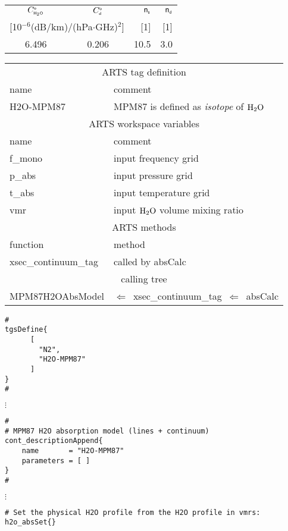 {\begin{center}
\begin{tabular}{ccrr}
\hline
\multicolumn{1}{c}{$C^{\mbox{\tiny \sf o}}_{\mbox{\tiny \sf H}_{2}\mbox{\tiny \sf O}}$} & \multicolumn{1}{c}{$C^{\mbox{\tiny \sf o}}_{\mbox{\tiny \sf d}}$} & ${\sf n}_{\mbox{\tiny \sf s}}$ & ${\sf n}_{\mbox{\tiny \sf d}}$ \\
\multicolumn{2}{c}{[10$^{-6}$(dB/km)/(hPa$\cdot$GHz)$^2$]} & [1] & [1] \\
\hline
6.496 & 0.206 & 10.5 & 3.0 \\
\hline
\end{tabular}
\end{center}
%
%
\begin{center}
\begin{tabular}{ll}
\hline
\multicolumn{2}{c}{ARTS tag definition}\\
name      & comment \\
H2O-MPM87 & MPM87 is defined as {\it isotope} of $\mbox{H}_2\mbox{O}$\\
\hline
\multicolumn{2}{c}{ARTS workspace variables}\\
name & comment \\
 f\_mono & input frequency grid \\
 p\_abs  & input pressure grid \\
 t\_abs  & input temperature grid\\
 vmr    & input $\mbox{H}_2\mbox{O}$ volume mixing ratio\\
\hline
\multicolumn{2}{c}{ARTS methods}\\
function           & method\\
xsec\_continuum\_tag & called by absCalc \\
\hline
\multicolumn{2}{c}{calling tree}\\
MPM87H2OAbsModel & $\Leftarrow$~xsec\_continuum\_tag~$\Leftarrow$~absCalc\\
\end{tabular}
\end{center}


\begin{verbatim}
#
tgsDefine{
      [ 
        "N2",
        "H2O-MPM87"
      ] 
}
#
\end{verbatim}
$\vdots$
\begin{verbatim}
#
# MPM87 H2O absorption model (lines + continuum)
cont_descriptionAppend{
    name       = "H2O-MPM87"
    parameters = [ ]
}
#
\end{verbatim}
$\vdots$
\begin{verbatim}
# Set the physical H2O profile from the H2O profile in vmrs:
h2o_absSet{}


\end{verbatim}}
